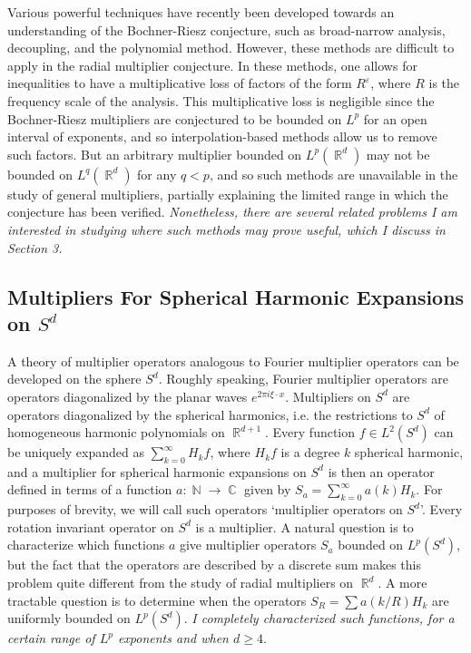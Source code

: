 \documentclass[11pt]{article}
\DeclareMathOperator{\RR}{\mathbb{R}}
\DeclareMathOperator{\NN}{\mathbb{N}}
\DeclareMathOperator{\CC}{\mathbb{C}}
\begin{document}
Various powerful techniques have recently been developed towards an understanding of the Bochner-Riesz conjecture, such as broad-narrow analysis, decoupling, and the polynomial method. However, these methods are difficult to apply in the radial multiplier conjecture. In these methods, one allows for inequalities to have a multiplicative loss of factors of the form $R^\varepsilon$, where $R$ is the frequency scale of the analysis. This multiplicative loss is negligible since the Bochner-Riesz multipliers are conjectured to be bounded on $L^p$ for an open interval of exponents, and so interpolation-based methods allow us to remove such factors.
But an arbitrary multiplier bounded on $L^p(\RR^d)$ may not be bounded on $L^q(\RR^d)$ for any $q < p$, and so such methods are unavailable in the study of general multipliers, partially explaining the limited range in which the conjecture has been verified. \emph{Nonetheless, there are several related problems I am interested in studying where such methods may prove useful, which I discuss in Section 3.}

\subsection{Multipliers For Spherical Harmonic Expansions on $S^d$}

A theory of multiplier operators analogous to Fourier multiplier operators can be developed on the sphere $S^d$. Roughly speaking, Fourier multiplier operators are operators diagonalized by the planar waves $e^{2 \pi i \xi \cdot x}$. Multipliers on $S^d$ are operators diagonalized by the spherical harmonics, i.e. the restrictions to $S^d$ of homogeneous harmonic polynomials on $\RR^{d+1}$. Every function $f \in L^2(S^d)$ can be uniquely expanded as $\sum_{k = 0}^\infty H_k f$, where $H_k f$ is a degree $k$ spherical harmonic, and a multiplier for spherical harmonic expansions on $S^d$ is then an operator defined in terms of a function $a: \NN \to \CC$ given by $S_a = \sum_{k = 0}^\infty a(k) H_k$.
%
%
For purposes of brevity, we will call such operators `multiplier operators on $S^d$'. Every rotation invariant operator on $S^d$ is a multiplier. %
A natural question is to characterize which functions $a$ give multiplier operators $S_a$ bounded on $L^p(S^d)$, but the fact that the operators are described by a discrete sum makes this problem quite different from the study of radial multipliers on $\RR^d$. A more tractable question is to determine when the operators $S_R = \sum a(k/R) H_k$ are uniformly bounded on $L^p(S^d)$. \emph{I completely characterized such functions, for a certain range of $L^p$ exponents and when $d \geq 4$}.
\end{document}
